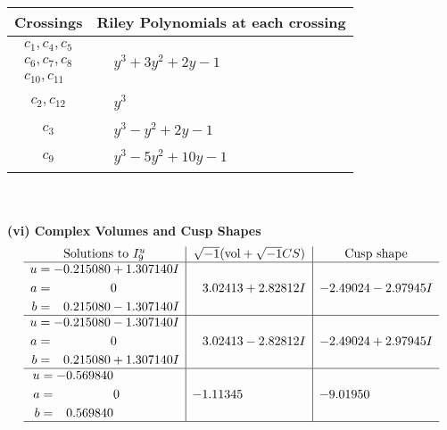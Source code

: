 \documentclass[1p]{elsarticle_modified}
\theoremstyle{definition}
\newcommand{\I}{\sqrt{-1}}
\begin{document}
\begin{tabular}{m{50pt}|m{274pt}}
Crossings & \hspace{64pt}Riley Polynomials at each crossing \\
\hline $$\begin{aligned}c_{1},c_{4},c_{5}\\c_{6},c_{7},c_{8}\\c_{10},c_{11}\end{aligned}$$&$\begin{aligned}
&y^3+3 y^2+2 y-1
\end{aligned}$\\
\hline $$\begin{aligned}c_{2},c_{12}\end{aligned}$$&$\begin{aligned}
&y^3
\end{aligned}$\\
\hline $$\begin{aligned}c_{3}\end{aligned}$$&$\begin{aligned}
&y^3- y^2+2 y-1
\end{aligned}$\\
\hline $$\begin{aligned}c_{9}\end{aligned}$$&$\begin{aligned}
&y^3-5 y^2+10 y-1
\end{aligned}$\\
\hline
\end{tabular}\\~\\
\newpage\flushleft \textbf{(vi) Complex Volumes and Cusp Shapes}
$$\begin{array}{c|c|c}  
\text{Solutions to }I^u_{9}& \I (\text{vol} + \sqrt{-1}CS) & \text{Cusp shape}\\
 \hline 
\begin{aligned}
u &= -0.215080 + 1.307140 I \\
a &= \phantom{-0.000000 } 0 \\
b &= \phantom{-}0.215080 - 1.307140 I\end{aligned}
 & \phantom{-}3.02413 + 2.82812 I & -2.49024 - 2.97945 I \\ \hline\begin{aligned}
u &= -0.215080 - 1.307140 I \\
a &= \phantom{-0.000000 } 0 \\
b &= \phantom{-}0.215080 + 1.307140 I\end{aligned}
 & \phantom{-}3.02413 - 2.82812 I & -2.49024 + 2.97945 I \\ \hline\begin{aligned}
u &= -0.569840\phantom{ +0.000000I} \\
a &= \phantom{-0.000000 } 0 \\
b &= \phantom{-}0.569840\phantom{ +0.000000I}\end{aligned}
 & -1.11345\phantom{ +0.000000I} & -9.01950\phantom{ +0.000000I}\\
 \hline 
 \end{array}$$\newpage\newpage\renewcommand{\arraystretch}{1}
\end{document}
